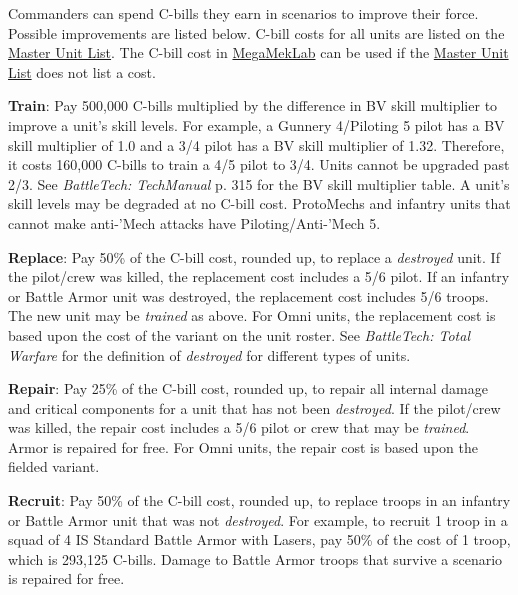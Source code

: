 Commanders can spend C-bills they earn in scenarios to improve their force.
Possible improvements are listed below.
C-bill costs for all units are listed on the \href{http://www.masterunitlist.info}{Master Unit List}.
The C-bill cost in \href{https://megamek.org}{MegaMekLab} can be used if the \href{http://www.masterunitlist.info}{Master Unit List} does not list a cost.

\begin{description}

\item {\bfseries Train}: Pay 500,000 C-bills multiplied by the difference in BV skill multiplier to improve a unit's skill levels.
For example, a Gunnery 4/Piloting 5 pilot has a BV skill multiplier of 1.0 and a 3/4 pilot has a BV skill multiplier of 1.32.
Therefore, it costs 160,000 C-bills to train a 4/5 pilot to 3/4.
Units cannot be upgraded past 2/3.
See \emph{BattleTech: TechManual} p. 315 for the BV skill multiplier table.
A unit's skill levels may be degraded at no C-bill cost.
ProtoMechs and infantry units that cannot make anti-'Mech attacks have Piloting/Anti-'Mech 5.

\item {\bfseries Replace}: Pay 50\% of the C-bill cost, rounded up, to replace a \emph{destroyed} unit.
If the pilot/crew was killed, the replacement cost includes a 5/6 pilot.
If an infantry or Battle Armor unit was destroyed, the replacement cost includes 5/6 troops.
The new unit may be \emph{trained} as above.
For Omni units, the replacement cost is based upon the cost of the variant on the unit roster.
See \emph{BattleTech: Total Warfare} for the definition of \emph{destroyed} for different types of units.

\item {\bfseries Repair}: Pay 25\% of the C-bill cost, rounded up, to repair all internal damage and critical components for a unit that has not been \emph{destroyed}.
If the pilot/crew was killed, the repair cost includes a 5/6 pilot or crew that may be \emph{trained}.
Armor is repaired for free.
For Omni units, the repair cost is based upon the fielded variant.

\item {\bfseries Recruit}: Pay 50\% of the C-bill cost, rounded up, to replace troops in an infantry or Battle Armor unit that was not \emph{destroyed}.
For example, to recruit 1 troop in a squad of 4 IS Standard Battle Armor with Lasers, pay 50\% of the cost of 1 troop, which is 293,125 C-bills.
Damage to Battle Armor troops that survive a scenario is repaired for free.


\end{description}
